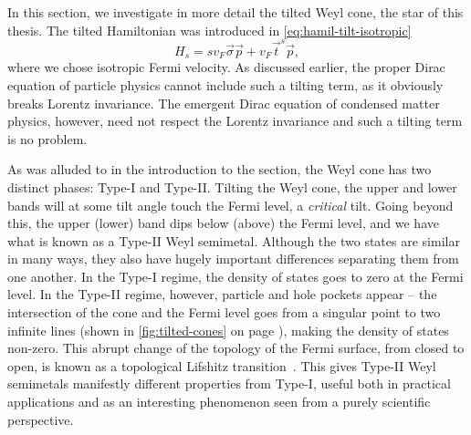 In this section, we investigate in more detail the tilted Weyl cone, the star of this thesis.
The tilted Hamiltonian was introduced in \cref{eq:hamil-tilt-isotropic}
\[
H_s = s v_F \vec{\sigma} \vec{p} + v_F \vec{t}^{s} \vec{p},
\]
where we chose isotropic Fermi velocity.
As discussed earlier, the proper Dirac equation of particle physics cannot include such a tilting term, as it obviously breaks Lorentz invariance.
The emergent Dirac equation of condensed matter physics, however, need not respect the Lorentz invariance and such a tilting term is no problem.

As was alluded to in the introduction to the section, the Weyl cone has two distinct phases: Type-I and
Type-II.
Tilting the Weyl cone, the upper and lower bands will at some tilt angle touch the Fermi level, a \emph{critical} tilt.
Going beyond this, the upper (lower) band dips below (above) the Fermi level, and we have what is known as a Type-II Weyl semimetal.
Although the two states are similar in many ways, they also have hugely important differences separating them from one another.
In the Type-I regime, the density of states goes to zero at the Fermi level.
In the Type-II regime, however, particle and hole pockets appear -- the intersection of the cone and the Fermi level goes from a singular point to two infinite lines (shown in \cref{fig:tilted-cones} on page \pageref{fig:tilted-cones}), making the density of states non-zero.
This abrupt change of the topology of the Fermi surface, from closed to open, is known as a topological Lifshitz transition~\cite{volovikTopologicalLifshitzTransitions2017}.
This gives Type-II Weyl semimetals manifestly different properties from Type-I, useful both in practical applications and as an interesting phenomenon seen from a purely scientific perspective.


